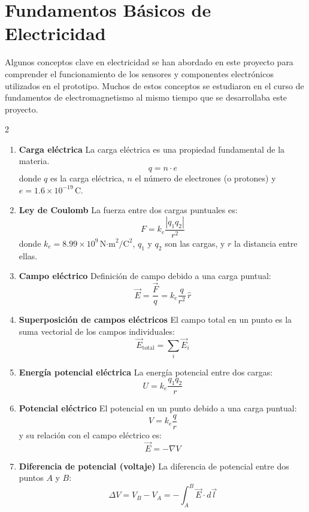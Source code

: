 \section*{Fundamentos Básicos de Electricidad}

Algunos conceptos clave en electricidad se han abordado en este proyecto para comprender el funcionamiento de los sensores y componentes electrónicos utilizados en el prototipo. Muchos de estos conceptos se estudiaron en el curso de fundamentos de electromagnetismo al mismo tiempo que se desarrollaba este proyecto.

\begin{multicols}{2}

\begin{enumerate}
    \item \textbf{Carga eléctrica}  
    La carga eléctrica es una propiedad fundamental de la materia.  
    \[
        q = n \cdot e
    \]  
    donde \( q \) es la carga eléctrica, \( n \) el número de electrones (o protones) y \( e = 1.6 \times 10^{-19}\,\text{C} \).

    \item \textbf{Ley de Coulomb}  
    La fuerza entre dos cargas puntuales es:  
    \[
        F = k_e \frac{|q_1 q_2|}{r^2}
    \]  
    donde \( k_e = 8.99 \times 10^9 \,\text{N·m}^2/\text{C}^2 \), \( q_1 \) y \( q_2 \) son las cargas, y \( r \) la distancia entre ellas.

    \item \textbf{Campo eléctrico}  
    Definición de campo debido a una carga puntual:  
    \[
        \vec{E} = \frac{\vec{F}}{q} = k_e \frac{q}{r^2} \,\hat{r}
    \]  

    \item \textbf{Superposición de campos eléctricos}  
    El campo total en un punto es la suma vectorial de los campos individuales:  
    \[
        \vec{E}_{\text{total}} = \sum_i \vec{E}_i
    \]

    \item \textbf{Energía potencial eléctrica}  
    La energía potencial entre dos cargas:  
    \[
        U = k_e \frac{q_1 q_2}{r}
    \]  

    \item \textbf{Potencial eléctrico}  
    El potencial en un punto debido a una carga puntual:  
    \[
        V = k_e \frac{q}{r}
    \]  
    y su relación con el campo eléctrico es:  
    \[
        \vec{E} = - \nabla V
    \]

    \item \textbf{Diferencia de potencial (voltaje)}  
    La diferencia de potencial entre dos puntos \(A\) y \(B\):  
    \[
        \Delta V = V_B - V_A = - \int_A^B \vec{E} \cdot d\vec{l}
    \]


\end{enumerate}
\end{multicols}
